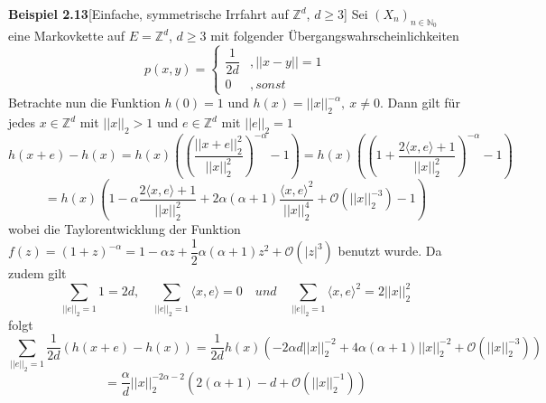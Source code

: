 \textbf{Beispiel 2.13}[Einfache, symmetrische Irrfahrt auf $\mathbb{Z}^{d}$, $d \geq 3$]
Sei $(X_{n})_{n \in \mathbb{N}_{0}}$ eine Markovkette auf $E = \mathbb{Z}^{d}$, $d \geq 3$ mit folgender Übergangswahrscheinlichkeiten
\begin{equation*}
p(x,y)=
\begin{cases}
\dfrac{1}{2d} & ,  \vert \vert x - y \vert \vert = 1\\
0 & , sonst
\end{cases}
\end{equation*}
Betrachte nun die Funktion $h(0)=1$ und $h(x)= {\vert \vert x \vert \vert}_{2}^{-\alpha}, \: x \neq 0$. Dann gilt für jedes $x \in \mathbb{Z}^{d}$ mit ${\vert \vert x \vert \vert}_{2} > 1$ und $e \in \mathbb{Z}^{d}$ mit ${\vert \vert e \vert \vert}_{2} = 1$
\begin{equation*}
h(x+e) - h(x) = h(x)\left(\left(\dfrac{{\vert \vert x + e \vert \vert}_{2}^{2}}{{\vert \vert x \vert \vert}_{2}^{2}}\right)^{-\alpha} - 1 \right) = h(x)\left(\left( 1 + \dfrac{{2\langle x,e \rangle + 1}}{{\vert \vert x \vert \vert}_{2}^{2}}\right)^{-\alpha} - 1 \right)
\end{equation*}
\begin{equation*}
 = h(x)\left(1 - \alpha \dfrac{{2\langle x,e \rangle + 1}}{{\vert \vert x \vert \vert}_{2}^{2} } + 2\alpha(\alpha + 1)\dfrac{{{\langle x,e \rangle}^{2}}}{{\vert \vert x \vert \vert}_{2}^{4} } + \mathcal{O}({\vert \vert x \vert \vert}_{2}^{-3}) - 1 \right)
\end{equation*}
wobei die Taylorentwicklung der Funktion $f(z)=(1+z)^{-\alpha}= 1 - \alpha z + \dfrac{1}{2} \alpha(\alpha +1)z^{2} + \mathcal{O}({\vert z \vert}^{3})$ benutzt wurde. Da zudem gilt
\begin{equation*}
\sum_{{\vert \vert e \vert \vert}_{2} = 1} 1 = 2d, \quad \sum_{{\vert \vert e \vert \vert}_{2} = 1} \langle x,e \rangle = 0 \quad und \quad \sum_{{\vert \vert e \vert \vert}_{2} = 1} {\langle x,e \rangle}^{2} = 2 {\vert \vert x \vert \vert}_{2}^{2}
\end{equation*}
folgt
\begin{equation*}
\sum_{{\vert \vert e \vert \vert}_{2} = 1} \dfrac{1}{2d} \left(h(x+e) - h(x)\right) = \dfrac{1}{2d}h(x)(-2 \alpha d {\vert \vert x \vert \vert}_{2}^{-2} + 4 \alpha (\alpha + 1){\vert \vert x \vert \vert}_{2}^{-2} + \mathcal{O}({\vert \vert x \vert \vert}_{2}^{-3}) )
\end{equation*}
\begin{equation*}
= \dfrac{\alpha}{d} {\vert \vert x \vert \vert}_{2}^{-2 \alpha - 2} (2(\alpha + 1) - d + \mathcal{O}({\vert \vert x \vert \vert}_{2}^{-1}))
\end{equation*}
